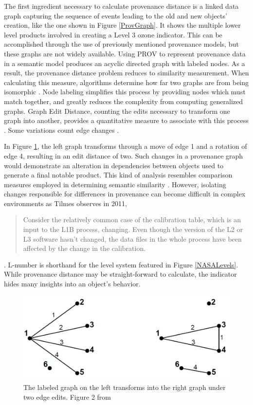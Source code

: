 The first ingredient necessary to calculate provenance distance is a linked data graph capturing the sequence of events leading to the old and new objects' creation, like the one shown in Figure \ref{ProvGraph}.
It shows the multiple lower level products involved in creating a Level 3 ozone indicator.
This can be accomplished through the use of previously mentioned provenance models, but these graphs are not widely available.
Using PROV to represent provenance data in a semantic model produces an acyclic directed graph with labeled nodes.
As a result, the provenance distance problem reduces to similarity measurement.
When calculating this measure, algorithms determine how far two graphs are from being isomorphic \cite{Cao2013}.
Node labeling simplifies this process by providing nodes which must match together, and greatly reduces the complexity from computing generalized graphs.
Graph Edit Distance, counting the edits necessary to transform one graph into another, provides a quantitative measure to associate with this process  \cite{Gao2010}.
Some variations count edge changes \cite{Goddard:1996:DGU:246962.246972}.

In Figure \ref{GraphEdit}, the left graph transforms through a move of edge 1 and a rotation of edge 4, resulting in an edit distance of two.
Such changes in a provenance graph would demonstrate an alteration in dependencies between objects used to generate a final notable product.
This kind of analysis resembles comparison measures employed in determining semantic similarity \cite{Hliaoutakis06informationretrieval}.
However, isolating changes responsible for differences in provenance can become difficult in complex environments as Tilmes observes in 2011, 
\begin{quotation}
	Consider the relatively common case of the calibration table, which is an input to the L1B process, changing. Even though the version of the L2 or L3 software hasn't changed, the data files in the whole process have been affected by the change in the calibration.
\end{quotation} \cite{TILMES2011548}.
L-number is shorthand for the level system featured in Figure \ref{NASALevels}.
While provenance distance may be straight-forward to calculate, the indicator hides many insights into an object's behavior.

\begin{figure}
	\centering
	\includegraphics[scale=0.40]{figures/GraphEdit.png}
	\caption[The labeled graph on the left transforms into the right graph under two edge edits.]{The labeled graph on the left transforms into the right graph under two edge edits. Figure 2 from \cite{Goddard:1996:DGU:246962.246972}}
	\label{GraphEdit}
\end{figure}

